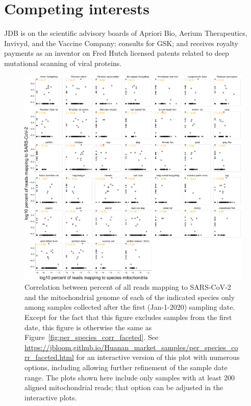 \documentclass[9pt,twocolumn,twoside]{gsajnl_modified}
\begin{document}
{\section{Competing interests}
JDB is on the scientific advisory boards of Apriori Bio, Aerium Therapeutics, Invivyd, and the Vaccine Company; consults for GSK; and receives royalty payments as an inventor on Fred Hutch licensed patents related to deep mutational scanning of viral proteins.


}

\onecolumn
\renewcommand{\thepage}{S\arabic{page}}
\setcounter{page}{1}
\renewcommand{\thefigure}{S\arabic{figure}}
\setcounter{figure}{0}
\renewcommand{\thetable}{S\arabic{table}}
\setcounter{table}{0}

\clearpage

\begin{figure}
\includegraphics[width=\linewidth]{figures/per_species_corr_faceted_later_dates.png}
\caption{
Correlation between percent of all reads mapping to SARS-CoV-2 and the mitochondrial genome of each of the indicated species only among samples collected after the first (Jan-1-2020) sampling date.
Except for the fact that this figure excludes samples from the first date, this figure is otherwise the same as Figure~\ref{fig:per_species_corr_faceted}.
See \url{https://jbloom.github.io/Huanan_market_samples/per_species_corr_faceted.html} for an interactive version of this plot with numerous options, including allowing further refinement of the sample date range.
The plots shown here include only samples with at least 200 aligned mitochondrial reads; that option can be adjusted in the interactive plots.
\label{fig:per_species_corr_faceted_later_dates}
}
\end{figure}
\end{document}
